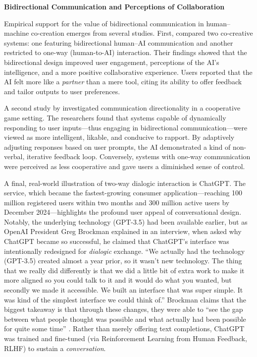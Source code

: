 \textbf{Bidirectional Communication and Perceptions of Collaboration}

Empirical support for the value of bidirectional communication in human–machine co-creation emerges from several studies. First, \citet{Rezwana2022-gg} compared two co-creative systems: one featuring bidirectional human–AI communication and another restricted to one-way (human-to-AI) interaction. Their findings showed that the bidirectional design improved user engagement, perceptions of the AI's intelligence, and a more positive collaborative experience. Users reported that the AI felt more like a \textit{partner} than a mere tool, citing its ability to offer feedback and tailor outputs to user preferences. 

A second study by \citet{Ashktorab2021-ie} investigated communication directionality in a cooperative game setting. The researchers found that systems capable of dynamically responding to user inputs—thus engaging in bidirectional communication—were viewed as more intelligent, likable, and conducive to rapport. By adaptively adjusting responses based on user prompts, the AI demonstrated a kind of non-verbal, iterative feedback loop. Conversely, systems with one-way communication were perceived as less cooperative and gave users a diminished sense of control.

A final, real-world illustration of two-way dialogic interaction is ChatGPT. The service, which became the fastest-growing consumer application—reaching 100 million registered users within two months and 300 million active users by December 2024—highlights the profound user appeal of conversational design. Notably, the underlying technology (GPT-3.5) had been available earlier, but as OpenAI President Greg Brockman explained in an interview, when asked why ChatGPT became so successful, he claimed that ChatGPT's interface was intentionally redesigned for \textit{dialogic} exchange. ``We actually had the technology (GPT-3.5) created almost a year prior, so it wasn't new technology. The thing that we really did differently is that we did a little bit of extra work to make it more aligned so you could talk to it and it would do what you wanted, but secondly we made it accessible. We built an interface that was super simple. It was kind of the simplest interface we could think of.'' Brockman claims that the biggest takeaway is that through these changes, they were able to ``see the gap between what people thought was possible and what actually had been possible for quite some time'' \citep{SXSW2023-wg}. Rather than merely offering text completions, ChatGPT was trained and fine-tuned (via Reinforcement Learning from Human Feedback, RLHF) to sustain a \textit{conversation}. 

